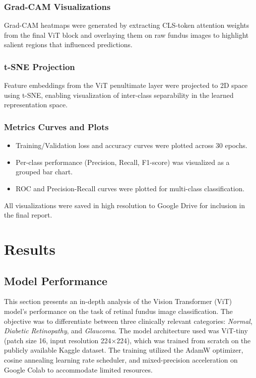 \documentclass[a4paper,12pt]{report}
\begin{document}
\subsection{Grad-CAM Visualizations}

Grad-CAM heatmaps were generated by extracting CLS-token attention weights from the final ViT block and overlaying them on raw fundus images to highlight salient regions that influenced predictions.

\subsection{t-SNE Projection}

Feature embeddings from the ViT penultimate layer were projected to 2D space using t-SNE, enabling visualization of inter-class separability in the learned representation space.

\subsection{Metrics Curves and Plots}

\begin{itemize}
    \item Training/Validation loss and accuracy curves were plotted across 30 epochs.
    \item Per-class performance (Precision, Recall, F1-score) was visualized as a grouped bar chart.
    \item ROC and Precision-Recall curves were plotted for multi-class classification.
\end{itemize}

All visualizations were saved in high resolution to Google Drive for inclusion in the final report.


\chapter{Results}

\section{Model Performance}

This section presents an in-depth analysis of the Vision Transformer (ViT) model's performance on the task of retinal fundus image classification. The objective was to differentiate between three clinically relevant categories: \textit{Normal}, \textit{Diabetic Retinopathy}, and \textit{Glaucoma}. The model architecture used was ViT-tiny (patch size 16, input resolution 224×224), which was trained from scratch on the publicly available Kaggle dataset. The training utilized the AdamW optimizer, cosine annealing learning rate scheduler, and mixed-precision acceleration on Google Colab to accommodate limited resources.
\end{document}
